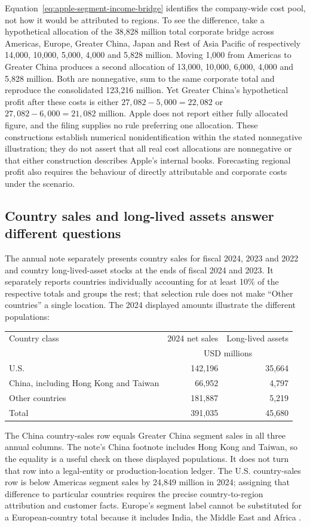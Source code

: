 Equation~\eqref{eq:apple-segment-income-bridge} identifies the company-wide cost pool, not how it would be
attributed to regions. To see the difference, take a hypothetical allocation
of the 38,828 million total corporate bridge across Americas, Europe, Greater
China, Japan and Rest of Asia Pacific of respectively 14,000, 10,000, 5,000,
4,000 and 5,828 million. Moving 1,000 from Americas to Greater China produces
a second allocation of 13,000, 10,000, 6,000, 4,000 and 5,828 million.
Both are nonnegative, sum to the same corporate total and reproduce the
consolidated 123,216 million. Yet Greater China's hypothetical profit after
these costs is either $27{,}082-5{,}000=22{,}082$ or
$27{,}082-6{,}000=21{,}082$ million. Apple does not report either fully
allocated figure, and the filing supplies no rule preferring one allocation.
These constructions establish numerical nonidentification within the stated
nonnegative illustration; they do not assert that all real cost allocations
are nonnegative or that either construction describes Apple's internal books.
Forecasting regional profit also requires the behaviour of directly
attributable and corporate costs under the scenario.

\subsection{Country sales and long-lived assets answer different questions}

The annual note separately presents country sales for fiscal 2024, 2023 and
2022 and country long-lived-asset stocks at the ends of fiscal 2024 and 2023.
It separately reports countries individually accounting for at least 10\% of
the respective totals and groups the rest; that selection rule does not make
``Other countries'' a single location. The 2024 displayed amounts illustrate
the different populations:
\begin{center}
\begin{tabular}{lrr}
\toprule
Country class & 2024 net sales & Long-lived assets\\
& \multicolumn{2}{c}{USD millions}\\\midrule
U.S. & 142,196 & 35,664\\
China, including Hong Kong and Taiwan & 66,952 & 4,797\\
Other countries & 181,887 & 5,219\\\midrule
Total & 391,035 & 45,680\\\bottomrule
\end{tabular}
\end{center}
The China country-sales row equals Greater China segment sales in all three
annual columns. The note's China footnote includes Hong Kong and Taiwan, so
the equality is a useful check on these displayed populations. It does not
turn that row into a legal-entity or production-location ledger. The U.S.
country-sales row is below Americas segment sales by 24,849 million in 2024;
assigning that difference to particular countries requires the precise
country-to-region attribution and customer facts. Europe's segment label
cannot be substituted for a European-country total because it includes India,
the Middle East and Africa \citep[Note 13, printed pp.~46--47]{apple2024}.

